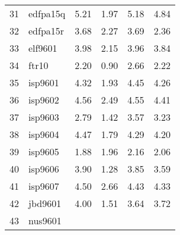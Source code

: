 \begin{longtable}{@{}llrrrr@{}}
31 & edfpa15q  & 5.21 & 1.97 & 5.18 & 4.84 \\
32 & edfpa15r  & 3.68 & 2.27 & 3.69 & 2.36 \\
33 & elf9601   & 3.98 & 2.15 & 3.96 & 3.84 \\
34 & ftr10     & 2.20 & 0.90 & 2.66 & 2.22 \\
35 & isp9601   & 4.32 & 1.93 & 4.45 & 4.26 \\
36 & isp9602   & 4.56 & 2.49 & 4.55 & 4.41 \\
37 & isp9603   & 2.79 & 1.42 & 3.57 & 3.23 \\
38 & isp9604   & 4.47 & 1.79 & 4.29 & 4.20 \\
39 & isp9605   & 1.88 & 1.96 & 2.16 & 2.06 \\
40 & isp9606   & 3.90 & 1.28 & 3.85 & 3.59 \\
41 & isp9607   & 4.50 & 2.66 & 4.43 & 4.33 \\
42 & jbd9601   & 4.00 & 1.51 & 3.64 & 3.72 \\
43 & nus9601   &      &      &      &      \\* \bottomrule
\end{longtable}
\